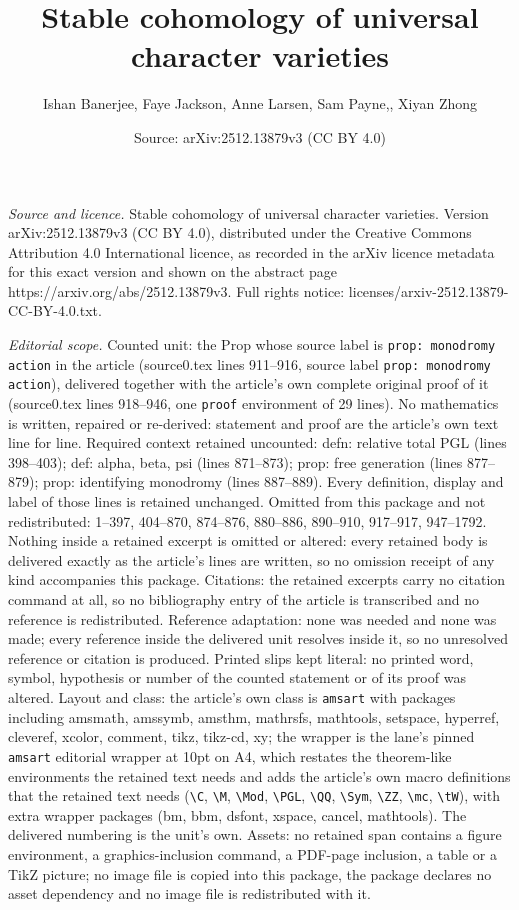 \documentclass[10pt,a4paper]{amsart}
\title[Stable cohomology of universal character varieties]{Stable cohomology of universal character varieties}
\author{Ishan Banerjee, Faye Jackson, Anne Larsen, Sam Payne,, Xiyan Zhong}
\date{Source: arXiv:2512.13879v3 (CC BY 4.0)}
\begin{document}
\maketitle

\noindent\emph{Source and licence.} Stable cohomology of universal character varieties. Version arXiv:2512.13879v3 (CC BY 4.0), distributed under the Creative Commons Attribution 4.0 International licence, as recorded in the arXiv licence metadata for this exact version and shown on the abstract page https://arxiv.org/abs/2512.13879v3. Full rights notice: licenses/arxiv-2512.13879-CC-BY-4.0.txt.\par\smallskip

\noindent\textit{Editorial scope.} Counted unit: the Prop whose source label is \texttt{prop: monodromy action} in the article (source0.tex lines 911--916, source label \texttt{prop: monodromy action}), delivered together with the article's own complete original proof of it (source0.tex lines 918--946, one \texttt{proof} environment of 29 lines). No mathematics is written, repaired or re-derived: statement and proof are the article's own text line for line. Required context retained uncounted: defn: relative total PGL (lines 398--403); def: alpha, beta, psi (lines 871--873); prop: free generation (lines 877--879); prop: identifying monodromy (lines 887--889). Every definition, display and label of those lines is retained unchanged. Omitted from this package and not redistributed: 1--397, 404--870, 874--876, 880--886, 890--910, 917--917, 947--1792. Nothing inside a retained excerpt is omitted or altered: every retained body is delivered exactly as the article's lines are written, so no omission receipt of any kind accompanies this package. Citations: the retained excerpts carry no citation command at all, so no bibliography entry of the article is transcribed and no reference is redistributed. Reference adaptation: none was needed and none was made; every reference inside the delivered unit resolves inside it, so no unresolved reference or citation is produced. Printed slips kept literal: no printed word, symbol, hypothesis or number of the counted statement or of its proof was altered. Layout and class: the article's own class is \texttt{amsart} with packages including amsmath, amssymb, amsthm, mathrsfs, mathtools, setspace, hyperref, cleveref, xcolor, comment, tikz, tikz-cd, xy; the wrapper is the lane's pinned \texttt{amsart} editorial wrapper at 10pt on A4, which restates the theorem-like environments the retained text needs and adds the article's own macro definitions that the retained text needs (\texttt{\textbackslash C}, \texttt{\textbackslash M}, \texttt{\textbackslash Mod}, \texttt{\textbackslash PGL}, \texttt{\textbackslash QQ}, \texttt{\textbackslash Sym}, \texttt{\textbackslash ZZ}, \texttt{\textbackslash mc}, \texttt{\textbackslash tW}), with extra wrapper packages (bm, bbm, dsfont, xspace, cancel, mathtools). The delivered numbering is the unit's own. Assets: no retained span contains a figure environment, a graphics-inclusion command, a PDF-page inclusion, a table or a TikZ picture; no image file is copied into this package, the package declares no asset dependency and no image file is redistributed with it. 
\end{document}
